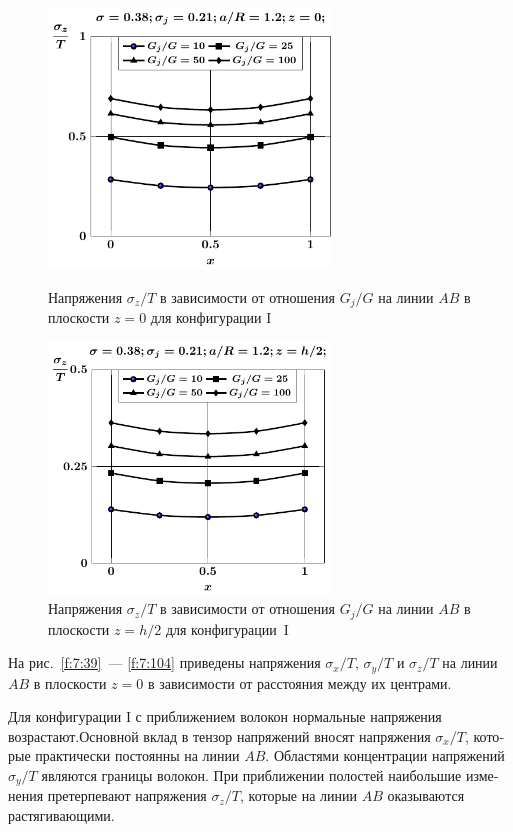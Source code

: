 \begin{russian}
\begin{figure}[h!]
\centering\footnotesize
\parbox[b]{7.5cm}{\centering\includegraphics[width=7.5cm]{inc2a-g-a12-h10-r10-z0-sig_z.pdf}
\caption{Напряжения $\sigma_z/T$ в зависимости от отношения $G_j/G$ на линии $AB$ в плоскости $z=0$ для конфигурации I
\label{f:7:107}}}\hfil\hfil
\parbox[b]{7.5cm}{\centering\includegraphics[width=7.5cm]{inc2a-g-a12-h10-r10-z1-sig_z.pdf}
\caption{Напряжения $\sigma_z/T$ в зависимости от отношения $G_j/G$ на линии $AB$ в плоскости $z=h/2$ для конфигурации~I
\label{f:7:108}}}
\end{figure}



На рис.~\ref{f:7:39}~--- \ref{f:7:104} приведены напряжения $\sigma_x/T$, $\sigma_y/T$ и $\sigma_z/T$ на линии $AB$ в плоскости $z=0$ в зависимости от расстояния между их центрами.

Для конфигурации I с приближением волокон нормальные напряжения возрастают.Основной вклад в тензор напряжений вносят напряжения $\sigma_x/T$, которые практически постоянны на линии $AB$. Областями концентрации напряжений $\sigma_y/T$ являются границы волокон. При приближении полостей наибольшие изменения претерпевают напряжения $\sigma_z/T$, которые на линии $AB$ оказываются растягивающими. 


\end{russian}

